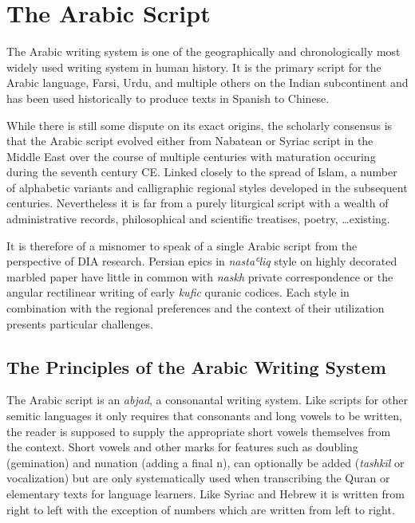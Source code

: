 \chapter{The Arabic Script}
\label{ch:arabic}

The Arabic writing system is one of the geographically and chronologically most
widely used writing system in human history. It is the primary script for the
Arabic language, Farsi, Urdu, and multiple others on the Indian subcontinent
and has been used historically to produce texts in Spanish to Chinese.

While there is still some dispute on its exact origins, the scholarly consensus
is that the Arabic script evolved either from Nabatean or Syriac script in the
Middle East over the course of multiple centuries with maturation occuring
during the seventh century CE.  Linked closely to the spread of Islam, a number
of alphabetic variants and calligraphic regional styles developed in the
subsequent centuries. Nevertheless it is far from a purely liturgical script
with a wealth of administrative records, philosophical and scientific
treatises, poetry, \dots existing.

It is therefore of a misnomer to speak of a single Arabic script from the
perspective of DIA research. Persian epics in \emph{nastaʿliq} style on highly
decorated marbled paper have little in common with \emph{naskh} private
correspondence or the angular rectilinear writing of early \emph{kufic} quranic
codices. Each style in combination with the regional preferences and the
context of their utilization presents particular challenges. 

\section{The Principles of the Arabic Writing System}

The Arabic script is an \emph{abjad}, a consonantal writing system. Like
scripts for other semitic languages it only requires that consonants and long
vowels to be written, the reader is supposed to supply the appropriate short
vowels themselves from the context. Short vowels and other marks for features
such as doubling (gemination) and nunation (adding a final n), can optionally
be added (\emph{tashkīl} or vocalization) but are only systematically used when
transcribing the Quran or elementary texts for language learners. Like Syriac
and Hebrew it is written from right to left with the exception of numbers which
are written from left to right.

